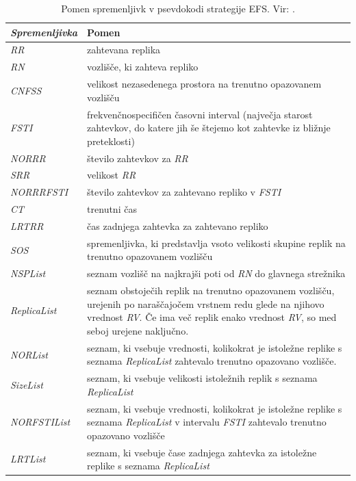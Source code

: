 \documentclass[a4paper, 12pt]{book}
\begin{document}
\begin{table}
\small
  \begin{center}
    \begin{tabulary}{1.0\textwidth}{ >{\itshape}p{6.8em} p{26em}}
      \textnormal{Spremenljivka} & Pomen \\
      \hline
      RR & zahtevana replika \\
      RN &  vozlišče, ki zahteva repliko \\
      CNFSS & velikost nezasedenega prostora na trenutno opazovanem
          \mbox{vozlišču} \\
      FSTI & frekvenčnospecifičen časovni interval (največja starost
         zahtevkov, do katere jih še štejemo kot zahtevke iz bližnje
         preteklosti) \\
      NORRR & število zahtevkov za \textit{RR} \\
      SRR & velikost \textit{RR} \\
      NORRRFSTI & število zahtevkov za zahtevano repliko
          v \textit{FSTI} \\
      CT & trenutni čas \\
      LRTRR & čas zadnjega zahtevka za zahtevano repliko \\
      SOS & spremenljivka, ki predstavlja vsoto velikosti skupine replik na
          trenutno opazovanem vozlišču \\
      NSPList & seznam vozlišč na najkrajši poti od \textit{RN} do
          glavnega strežnika \\
      ReplicaList & seznam obstoječih replik na trenutno opazovanem vozlišču,
          urejenih po naraščajočem vrstnem redu glede na njihovo vrednost
          \textit{RV}. Če ima več replik enako vrednost \textit{RV}, so med
          seboj urejene naključno. \\
      NORList & seznam, ki vsebuje vrednosti, kolikokrat je istoležne
          replike s seznama \textit{ReplicaList} zahtevalo
          trenutno opazovano vozlišče. \\
      SizeList & seznam, ki vsebuje velikosti istoležnih replik s seznama
          \textit{ReplicaList} \\
      NORFSTIList & seznam, ki vsebuje vrednosti, kolikokrat je istoležne
          replike s seznama \textit{ReplicaList} v intervalu \textit{FSTI}
          zahtevalo trenutno opazovano vozlišče  \\
      LRTList & seznam, ki vsebuje čase zadnjega zahtevka za istoležne
          replike s seznama \textit{ReplicaList}
    \end{tabulary}
 \end{center}

  \caption{Pomen spremenljivk v psevdokodi strategije EFS. Vir: \cite{efs2011}.}
  \label{tbl:EFS_vars}
\end{table}
\end{document}

